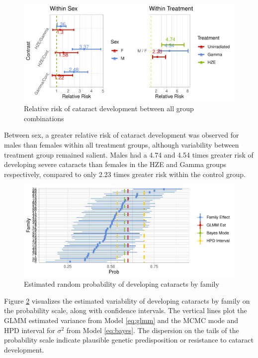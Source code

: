 \documentclass[12pt]{article}
\begin{document}
\begin{figure}[H]

{\centering \includegraphics{bookdown_report_files/figure-latex/RR-1} 

}

\caption{Relative risk of cataract development between all group combinations}\label{fig:RR}
\end{figure}

Between sex, a greater relative risk of cataract development was observed for males than females within all treatment groups, although variability between treatment group remained salient. Males had a 4.74 and 4.54 times greater risk of developing severe cataracts than females in the HZE and Gamma groups respectively, compared to only 2.23 times greater risk within the control group.

\begin{figure}[H]

{\centering \includegraphics{bookdown_report_files/figure-latex/re-1} 

}

\caption{Estimated random probability of developing cataracts by family}\label{fig:re}
\end{figure}

Figure \ref{fig:re} visualizes the estimated variability of developing cataracts by family on the probability scale, along with confidence intervals. The vertical lines plot the GLMM estimated variance from Model \eqref{eq:glmm} and the MCMC mode and HPD interval for \(\sigma^2\) from Model \eqref{eq:bayes}. The dispersion on the tails of the probability scale indicate plausible genetic predisposition or resistance to cataract development.
\end{document}
